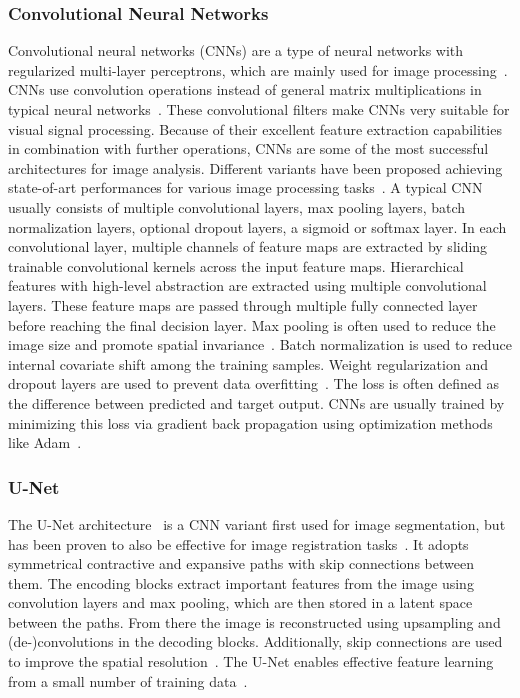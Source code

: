 \subsubsection{Convolutional Neural Networks} \label{SubSubSec:CNNs}
Convolutional neural networks (CNNs) are a type of neural networks with regularized multi-layer perceptrons, which are mainly used for image processing~\cite{Xiao2021}. CNNs use convolution operations instead of general matrix multiplications in typical neural networks~\cite{CNN1,CNN2}. These convolutional filters make CNNs very suitable for visual signal processing. Because of their excellent feature extraction capabilities in combination with further operations, CNNs are some of the most successful architectures for image analysis. Different variants have been proposed achieving state-of-art performances for various image processing tasks~\cite{CNN2}. A typical CNN usually consists of multiple convolutional layers, max pooling layers, batch normalization layers, optional dropout layers, a sigmoid or softmax layer. In each convolutional layer, multiple channels of feature maps are extracted by sliding trainable convolutional kernels across the input feature maps. Hierarchical features with high-level abstraction are extracted using multiple convolutional layers. These feature maps are passed through multiple fully connected layer before reaching the final decision layer. Max pooling is often used to reduce the image size and promote spatial invariance~\cite{Chen2020}. Batch normalization is used to reduce internal covariate shift among the training samples. Weight regularization and dropout layers are used to prevent data overfitting~\cite{Fu2020}. The loss is often defined as the difference between predicted and target output. CNNs are usually trained by minimizing this loss via gradient back propagation using optimization methods like Adam~\cite{Adam}. 

\subsubsection{U-Net} \label{SubSubSec:U-Net}
The U-Net architecture~\cite{U-Net} is a CNN variant first used for image segmentation, but has been proven to also be effective for image registration tasks~\cite{Jia2022b}. It adopts symmetrical contractive and expansive paths with skip connections between them. The encoding blocks extract important features from the image using convolution layers and max pooling, which are then stored in a latent space between the paths. From there the image is reconstructed using upsampling and (de-)convolutions in the decoding blocks. Additionally, skip connections are used to improve the spatial resolution~\cite{U-Net}. The U-Net enables effective feature learning from a small number of training data~\cite{Fu2020}. 

